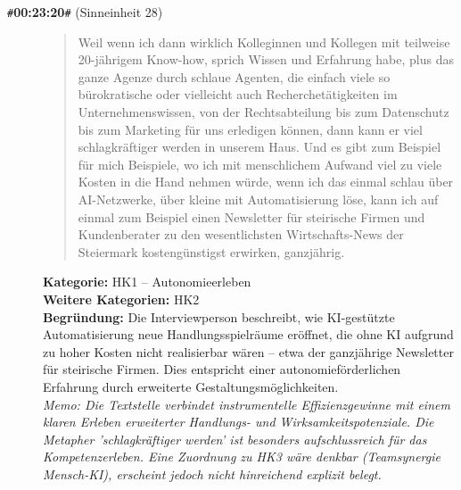 \begin{description}
  \item[\texttt{\#}\textbf{00:23:20}\texttt{\#} (Sinneinheit 28)]
  \begin{quote}
  Weil wenn ich dann wirklich Kolleginnen und Kollegen mit teilweise 20-jährigem Know-how, sprich Wissen und Erfahrung habe, plus das ganze Agenze durch schlaue Agenten, die einfach viele so bürokratische oder vielleicht auch Recherchetätigkeiten im Unternehmenswissen, von der Rechtsabteilung bis zum Datenschutz bis zum Marketing für uns erledigen können, dann kann er viel schlagkräftiger werden in unserem Haus. Und es gibt zum Beispiel für mich Beispiele, wo ich mit menschlichem Aufwand viel zu viele Kosten in die Hand nehmen würde, wenn ich das einmal schlau über AI-Netzwerke, über kleine mit Automatisierung löse, kann ich auf einmal zum Beispiel einen Newsletter für steirische Firmen und Kundenberater zu den wesentlichsten Wirtschafts-News der Steiermark kostengünstigst erwirken, ganzjährig.
  \end{quote}
  \textbf{Kategorie:} HK1 -- Autonomieerleben\\
  \textbf{Weitere Kategorien:} HK2\\
  \textbf{Begr\"undung:} Die Interviewperson beschreibt, wie KI-gestützte Automatisierung neue Handlungsspielräume eröffnet, die ohne KI aufgrund zu hoher Kosten nicht realisierbar wären – etwa der ganzjährige Newsletter für steirische Firmen. Dies entspricht einer autonomieförderlichen Erfahrung durch erweiterte Gestaltungsmöglichkeiten.
  \\\textit{Memo: Die Textstelle verbindet instrumentelle Effizienzgewinne mit einem klaren Erleben erweiterter Handlungs- und Wirksamkeitspotenziale. Die Metapher 'schlagkräftiger werden' ist besonders aufschlussreich für das Kompetenzerleben. Eine Zuordnung zu HK3 wäre denkbar (Teamsynergie Mensch-KI), erscheint jedoch nicht hinreichend explizit belegt.}
\end{description}
\medskip

